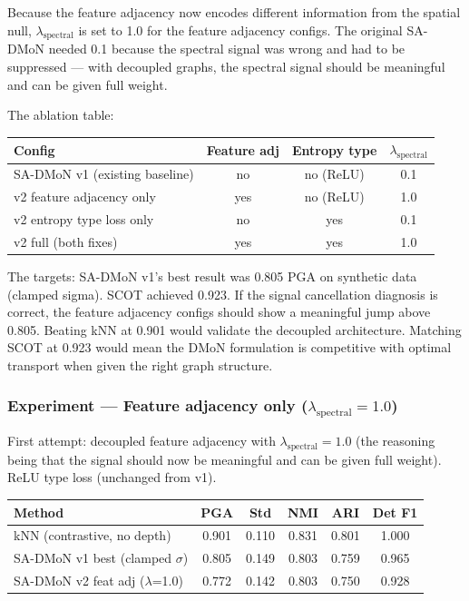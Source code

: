 Because the feature adjacency now encodes different information from the spatial null, $\lambda_{\text{spectral}}$ is set to 1.0 for the feature adjacency configs. The original SA-DMoN needed 0.1 because the spectral signal was wrong and had to be suppressed --- with decoupled graphs, the spectral signal should be meaningful and can be given full weight.

The ablation table:
\begin{center}
\footnotesize
\begin{tabular}{lccc}
\toprule
Config & Feature adj & Entropy type & $\lambda_{\text{spectral}}$ \\
\midrule
SA-DMoN v1 (existing baseline) & no & no (ReLU) & 0.1 \\
v2 feature adjacency only & yes & no (ReLU) & 1.0 \\
v2 entropy type loss only & no & yes & 0.1 \\
v2 full (both fixes) & yes & yes & 1.0 \\
\bottomrule
\end{tabular}
\end{center}

The targets: SA-DMoN v1's best result was 0.805 PGA on synthetic data (clamped sigma). SCOT achieved 0.923. If the signal cancellation diagnosis is correct, the feature adjacency configs should show a meaningful jump above 0.805. Beating kNN at 0.901 would validate the decoupled architecture. Matching SCOT at 0.923 would mean the DMoN formulation is competitive with optimal transport when given the right graph structure.


\subsubsection{Experiment --- Feature adjacency only ($\lambda_{\text{spectral}} = 1.0$)}

First attempt: decoupled feature adjacency with $\lambda_{\text{spectral}} = 1.0$ (the reasoning being that the signal should now be meaningful and can be given full weight). ReLU type loss (unchanged from v1).

\begin{center}
\footnotesize
\begin{tabular}{lccccc}
\toprule
Method & PGA & Std & NMI & ARI & Det F1 \\
\midrule
kNN (contrastive, no depth) & 0.901 & 0.110 & 0.831 & 0.801 & 1.000 \\
SA-DMoN v1 best (clamped $\sigma$) & 0.805 & 0.149 & 0.803 & 0.759 & 0.965 \\
SA-DMoN v2 feat adj ($\lambda$=1.0) & 0.772 & 0.142 & 0.803 & 0.750 & 0.928 \\
\bottomrule
\end{tabular}
\end{center}

